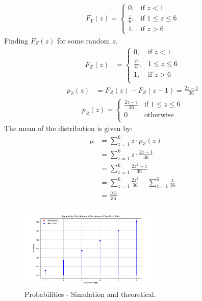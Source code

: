 \documentclass[journal,12pt,twocolumn]{IEEEtran}
\begin{document}
\begin{align}
F_Y(z) = \begin{cases}
  0, & \text{if } z < 1 \\
  \frac{z}{6}, & \text{if } 1 \leq z \leq 6 \\
  1, & \text{if } z > 6
\end{cases}
\end{align}
Finding $F_Z(z)$ for some random $z$.
\begin{align}
F_Z(z) &=
    \begin{cases}
     0, & \text{if } z < 1 \\
    \frac{z^2}{6}, & 1 \leq z \leq 6\\
     1, & \text{if } z > 6 \\
    \end{cases}
\end{align}
\begin{align}
p_Z(z) &= F_Z(z) - F_Z(z-1) = \frac{2z-1}{36} 
\end{align}
\begin{align}
p_Z(z) = \begin{cases} 
       \frac{2z-1}{36} & \text{if } 1 \leq z \leq 6 \\
        0 & \text{otherwise} \\
         \end{cases}
\end{align}
The mean of the distribution is given by:
\begin{align}
\mu &= \sum_{z=1}^{6} z \cdot p_Z(z) \\
&= \sum_{z=1}^{6} z \cdot \frac{2z-1}{36} \\
&= \sum_{z=1}^{6} \frac{2z^2-z}{36} \\
&= \sum_{z=1}^{6} \frac{2z^2}{36} - \sum_{z=1}^{6} \frac{z}{36} \\ 
&= \frac{161}{36}
\end{align}
\begin{figure}[ht]
\centering
\includegraphics[width=0.6\textwidth]{exemplar/12/13/3/35/figs/Figure.png}
\caption{Probabilities - Simulation and theoretical.}
\label{fig:exemplar.12.13.3.35}
\end{figure}
\end{document}
